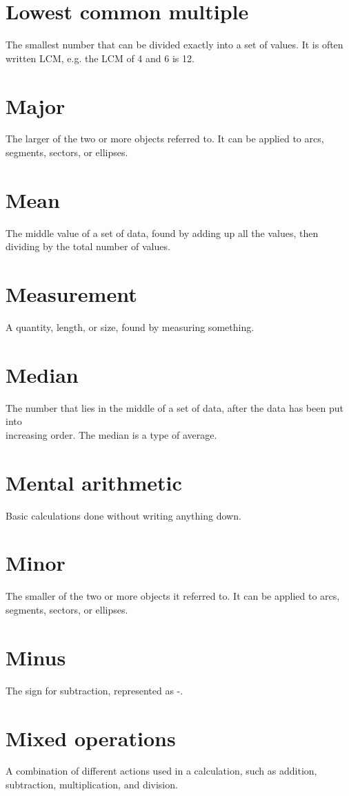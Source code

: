 \documentclass[10pt]{article}
\begin{document}
\section*{Lowest common multiple}
The smallest number that can be divided exactly into a set of values. It is often written LCM, e.g. the LCM of 4 and 6 is 12.

\section*{Major}
The larger of the two or more objects referred to. It can be applied to arcs, segments, sectors, or ellipses.

\section*{Mean}
The middle value of a set of data, found by adding up all the values, then dividing by the total number of values.

\section*{Measurement}
A quantity, length, or size, found by measuring something.

\section*{Median}
The number that lies in the middle of a set of data, after the data has been put into\\
increasing order. The median is a type of average.

\section*{Mental arithmetic}
Basic calculations done without writing anything down.

\section*{Minor}
The smaller of the two or more objects it referred to. It can be applied to arcs, segments, sectors, or ellipses.

\section*{Minus}
The sign for subtraction, represented as -.

\section*{Mixed operations}
A combination of different actions used in a calculation, such as addition, subtraction, multiplication, and division.
\end{document}
